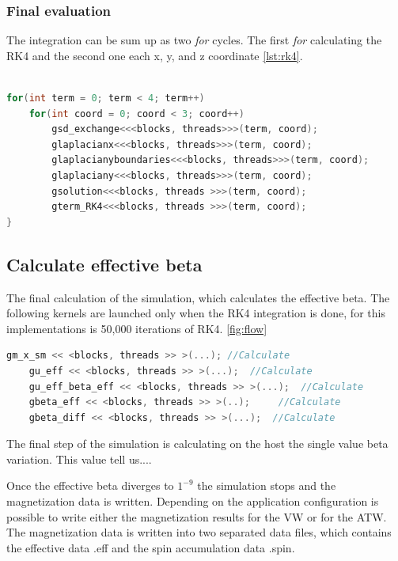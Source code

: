 \subsubsection{Final evaluation}

The integration can be sum up as two \textit{for} cycles. The first \textit{for} calculating the RK4 and the second one each x, y, and z coordinate \ref{lst:rk4}.

\begin{lstlisting}[language=C++, label={lst:rk4}, caption={Summarize of Runge and Kutta 4th Integration}]	

for(int term = 0; term < 4; term++)
	for(int coord = 0; coord < 3; coord++)
    	gsd_exchange<<<blocks, threads>>>(term, coord);
    	glaplacianx<<<blocks, threads>>>(term, coord);
    	glaplacianyboundaries<<<blocks, threads>>>(term, coord);
    	glaplaciany<<<blocks, threads>>>(term, coord);
    	gsolution<<<blocks, threads >>>(term, coord);
    	gterm_RK4<<<blocks, threads >>>(term, coord);
}
\end{lstlisting}


\subsection{Calculate effective beta}

The final calculation of the simulation, which calculates the effective beta. The following kernels are launched only when the RK4 integration is done, for this implementations is 50,000 iterations of RK4. \ref{fig:flow}

\begin{lstlisting}[language=C++, label={lst:beta}, caption={Calculate effective beta}]
    gm_x_sm << <blocks, threads >> >(...); //Calculate
    gu_eff << <blocks, threads >> >(...);  //Calculate 
    gu_eff_beta_eff << <blocks, threads >> >(...); 	//Calculate
    gbeta_eff << <blocks, threads >> >(..); 	//Calculate
    gbeta_diff << <blocks, threads >> >(...);  //Calculate             
\end{lstlisting}


The final step of the simulation is calculating on the host the single value beta variation. This value tell us....


Once the effective beta diverges to $1^{-9}$ the simulation stops and the magnetization data is written. Depending on the application configuration is possible to write  either  the magnetization results for the VW or for the ATW. The magnetization data is written into two separated data files, which contains the effective data .eff and the spin accumulation data .spin.

